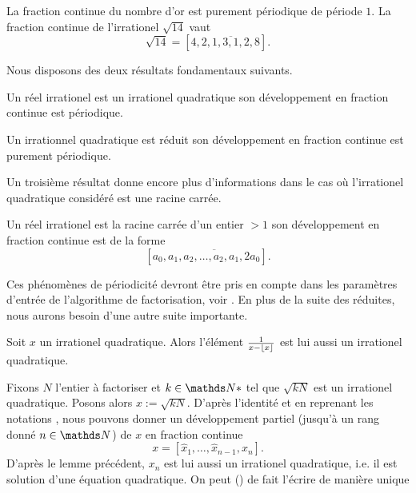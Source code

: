 \begin{exemple}
	La fraction continue du nombre d'or est purement périodique de période $1$.
	La fraction continue de l'irrationel $\sqrt{14}$ vaut \[\sqrt{14} = [4,
	\overline{2, 1, 3, 1, 2, 8}].\]
\end{exemple}

Nous disposons des deux résultats fondamentaux suivants.

\begin{theoreme}[Lagrange, 1770]
	Un réel irrationel est un irrationel quadratique \ssi son développement en
	fraction continue est périodique.
\end{theoreme}

\begin{theoreme}[Galois, 1829]
	Un irrationnel quadratique est réduit \ssi son développement en fraction
	continue est purement périodique.
\end{theoreme}

Un troisième résultat donne encore plus d'informations dans le cas où
l'irrationel quadratique considéré est une racine carrée.

\begin{theoreme}[Legendre, 1798]
	Un réel irrationel est la racine carrée d'un entier $>1$ \ssi son
	développement en fraction continue est de la forme \[[a_0, \overline{a_1,
	a_2, \dots, a_2, a_1, 2a_0}].\]
\end{theoreme}

Ces phénomènes de périodicité devront être pris en compte dans les paramètres
d'entrée de l'algorithme de factorisation, voir . En plus de la suite
des réduites, nous aurons besoin d'une autre suite importante.

\begin{lemme}
	Soit $x$ un irrationel quadratique. Alors l'élément $\frac{1}{x - \lfloor x\rfloor}$
	est lui aussi un irrationel quadratique. 
\end{lemme}

Fixons $N$ l'entier à factoriser et $k\in \N*$ tel que $\sqrt{kN}$ est un
irrationel quadratique. Posons alors $x := \sqrt{kN}$. D'après l'identité
\label{egalite-reduite} et en reprenant les notations \label{notations}, nous
pouvons donner un développement partiel (jusqu'à un rang donné $n\in
\N$) de $x$ en fraction continue \[x = [\hat{x}_1, \dots, \hat{x}_{n-1},
x_n].\] D'après le lemme précédent, $x_n$ est lui aussi un irrationel
quadratique, i.e. il est solution d'une équation quadratique. On peut
() de fait l'écrire de manière unique 

